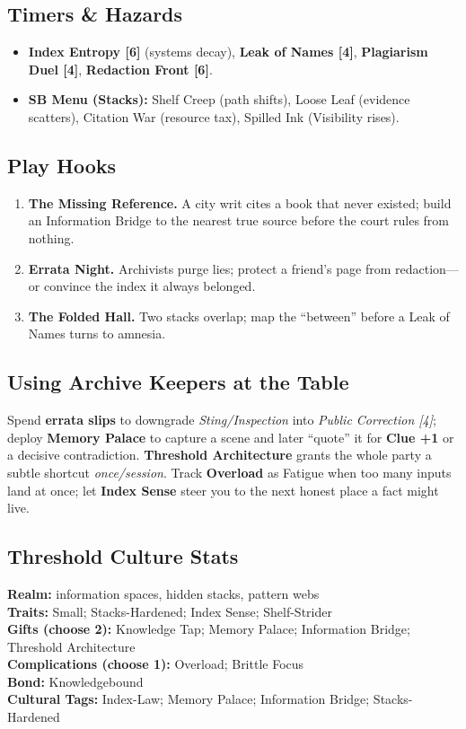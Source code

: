 \documentclass[11pt,letterpaper]{article}
\begin{document}
\subsection*{Timers \& Hazards}
\begin{itemize}
\item \textbf{Index Entropy [6]} (systems decay), \textbf{Leak of Names [4]}, \textbf{Plagiarism Duel [4]}, \textbf{Redaction Front [6]}.
\item \textbf{SB Menu (Stacks):} Shelf Creep (path shifts), Loose Leaf (evidence scatters), Citation War (resource tax), Spilled Ink (Visibility rises).
\end{itemize}

\subsection*{Play Hooks}
\begin{enumerate}
\item \textbf{The Missing Reference.} A city writ cites a book that never existed; build an Information Bridge to the nearest true source before the court rules from nothing.
\item \textbf{Errata Night.} Archivists purge lies; protect a friend's page from redaction---or convince the index it always belonged.
\item \textbf{The Folded Hall.} Two stacks overlap; map the ``between'' before a Leak of Names turns to amnesia.
\end{enumerate}

\subsection*{Using Archive Keepers at the Table}
Spend \textbf{errata slips} to downgrade \emph{Sting/Inspection} into \emph{Public Correction [4]}; deploy \textbf{Memory Palace} to capture a scene and later ``quote'' it for \textbf{Clue +1} or a decisive contradiction. \textbf{Threshold Architecture} grants the whole party a subtle shortcut \emph{once/session}. Track \textbf{Overload} as Fatigue when too many inputs land at once; let \textbf{Index Sense} steer you to the next honest place a fact might live.

\subsection*{Threshold Culture Stats}
\textbf{Realm:} information spaces, hidden stacks, pattern webs \\
\textbf{Traits:} Small; Stacks-Hardened; Index Sense; Shelf-Strider \\
\textbf{Gifts (choose 2):} Knowledge Tap; Memory Palace; Information Bridge; Threshold Architecture \\
\textbf{Complications (choose 1):} Overload; Brittle Focus \\
\textbf{Bond:} Knowledgebound \\
\textbf{Cultural Tags:} Index-Law; Memory Palace; Information Bridge; Stacks-Hardened
\end{document}
